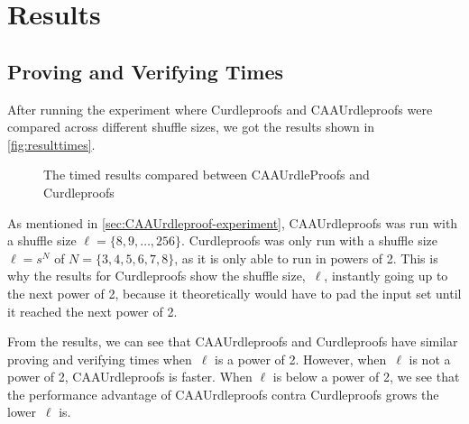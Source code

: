 \section{Results}\label{sec:results}
\subsection{Proving and Verifying Times}\label{subsec:results:provingverifying}

After running the experiment where Curdleproofs and CAAUrdleproofs were compared across different shuffle sizes, we got the results shown in \autoref{fig:resulttimes}.

\begin{figure}[!htb]
    \centering
    \qquad
    \caption{The timed results compared between CAAUrdleProofs and Curdleproofs}%
    \label{fig:resulttimes}%
\end{figure}

As mentioned in \autoref{sec:CAAUrdleproof-experiment}, CAAUrdleproofs was run with a shuffle size $\ell=\{8,9,\dots,256\}$.
Curdleproofs was only run with a shuffle size $\ell = s^N$ of $N = \{3,4,5,6,7,8\}$, as it is only able to run in powers of 2.
This is why the results for Curdleproofs show the shuffle size,~$\ell$, instantly going up to the next power of 2, because it theoretically would have to pad the input set until it reached the next power of 2.

From the results, we can see that CAAUrdleproofs and Curdleproofs have similar proving and verifying times when~$\ell$ is a power of 2.
However, when~$\ell$ is not a power of 2, CAAUrdleproofs is faster.
When $\ell$ is below a power of 2, we see that the performance advantage of CAAUrdleproofs contra Curdleproofs grows the lower~$\ell$ is.

